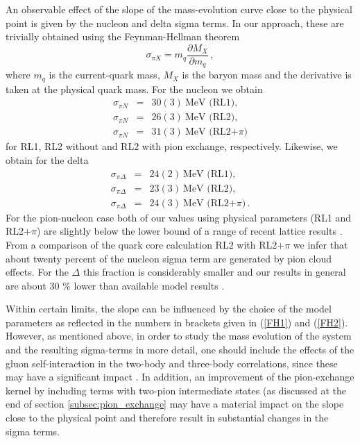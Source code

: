 An observable effect of the slope of the mass-evolution curve close to the physical
point is given by the nucleon and delta sigma terms. In our approach, these are
trivially obtained using the Feynman-Hellman theorem
\begin{equation}
 \sigma_{\pi X}=m_q\frac{\partial M_X}{\partial m_q}\,,
\end{equation}\label{eq:sigma_terms}
where $m_q$ is the current-quark mass, $M_X$ is the baryon mass and the derivative 
is taken at the physical quark mass. For the nucleon we obtain 
\begin{eqnarray}
\sigma_{\pi N} &=& 30 (3)~\mbox{MeV (RL1)}, \nonumber\\
\sigma_{\pi N} &=& 26 (3)~\mbox{MeV (RL2)}, \nonumber\\
\sigma_{\pi N} &=& 31 (3)~\mbox{MeV (RL2+$\pi$)} \label{FH1}
\end{eqnarray}
for RL1, RL2 without and RL2 with pion exchange, respectively. Likewise, we obtain 
for the delta 
\begin{eqnarray}
\sigma_{\pi \Delta} &=& 24 (2)~\mbox{MeV (RL1)}, \nonumber\\
\sigma_{\pi \Delta} &=& 23 (3)~\mbox{MeV (RL2)}, \nonumber\\
\sigma_{\pi \Delta} &=& 24 (3)~\mbox{MeV (RL2+$\pi$)}\,. \label{FH2}
\end{eqnarray}
For the pion-nucleon case both of our values using physical parameters (RL1 and RL2+$\pi$) 
are slightly below the lower bound of a range of recent lattice 
results \cite{Shanahan:2012wh,Alvarez-Ruso:2013fza,Bali:2013dpa}. From a comparison of the
quark core calculation RL2 with RL2+$\pi$ we infer that about twenty percent of the nucleon
sigma term are generated by pion cloud effects. For the $\Delta$ this fraction is considerably 
smaller and our results in general are about 30 \% lower than available model 
results \cite{Lyubovitskij:2000sf,Cavalcante:2005mb}.

Within certain limits, the slope can be influenced by the choice of the model
parameters as reflected in the numbers in brackets given in (\ref{FH1}) and (\ref{FH2}).
However, as mentioned above, in order to study the mass evolution of the system 
and the resulting sigma-terms in more detail, one should include 
the effects of the gluon self-interaction in the two-body and three-body 
correlations, since these may have a significant impact \cite{Fischer:2009jm}. 
In addition, an improvement of the pion-exchange kernel by including terms 
with two-pion intermediate states 
(as discussed at the end of section \ref{subsec:pion_exchange} may have a
material impact on the slope close to the physical point and therefore result
in substantial changes in the sigma terms.

